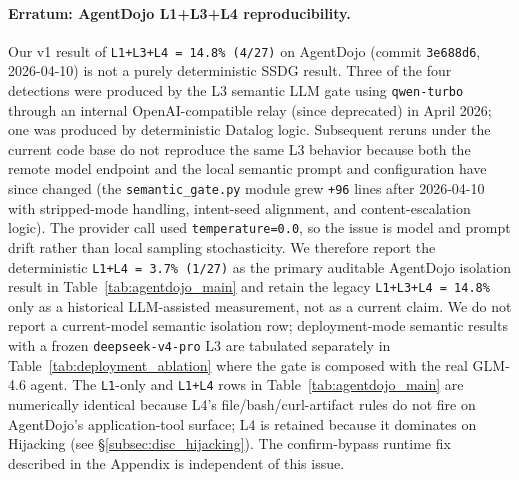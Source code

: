 \documentclass{article}
\theoremstyle{definition}
\begin{document}
\paragraph{Erratum: AgentDojo L1+L3+L4 reproducibility.} Our v1 result
of \texttt{L1+L3+L4 = 14.8\% (4/27)} on AgentDojo (commit
\texttt{3e688d6}, 2026-04-10) is not a purely deterministic SSDG
result. Three of the four detections were produced by the L3 semantic
LLM gate using \texttt{qwen-turbo} through an internal OpenAI-compatible
relay (since deprecated) in April 2026; one was produced by deterministic Datalog logic.
Subsequent reruns under the current code base do not reproduce the same
L3 behavior because both the remote model endpoint and the local
semantic prompt and configuration have since changed (the
\texttt{semantic\_gate.py} module grew \texttt{+96} lines after
2026-04-10 with stripped-mode handling, intent-seed alignment, and
content-escalation logic). The provider call used
\texttt{temperature=0.0}, so the issue is model and prompt drift rather
than local sampling stochasticity. We therefore report the deterministic
\texttt{L1+L4 = 3.7\% (1/27)} as the primary auditable AgentDojo isolation
result in Table~\ref{tab:agentdojo_main} and retain the legacy
\texttt{L1+L3+L4 = 14.8\%} only as a historical LLM-assisted measurement,
not as a current claim. We do not report a current-model semantic
isolation row; deployment-mode semantic results with a frozen
\texttt{deepseek-v4-pro} L3 are tabulated separately in
Table~\ref{tab:deployment_ablation} where the gate is composed with the
real GLM-4.6 agent. The
\texttt{L1}-only and \texttt{L1+L4} rows in
Table~\ref{tab:agentdojo_main} are numerically identical because L4's
file/bash/curl-artifact rules do not fire on AgentDojo's
application-tool surface; L4 is retained because it dominates on
Hijacking (see \S\ref{subsec:disc_hijacking}). The confirm-bypass
runtime fix described in the Appendix is independent of this issue.
\end{document}
